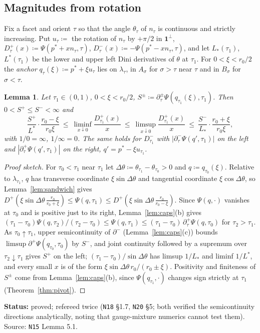 \documentclass[11pt]{article}
\newtheorem{lemma}[theorem]{Lemma}
\theoremstyle{definition}
\theoremstyle{remark}
\newcommand{\one}{\mathbf 1}
\newcommand{\src}[1]{\texttt{#1}}
\newcommand{\status}[1]{\par\smallskip\noindent\textbf{Status:} #1\par\smallskip}
\begin{document}
\subsection{Magnitudes from rotation}

Fix a facet and orient $\tau$ so that the angle $\theta_\tau$ of $n_\tau$ is continuous and strictly increasing. Put $u_\tau\coloneqq$ the rotation of $n_\tau$ by $+\pi/2$ in $\one^\perp$, $D^+_\tau(x)\coloneqq\Psi(p^*+xn_\tau,\tau)$, $D^-_\tau(x)\coloneqq-\Psi(p^*-xn_\tau,\tau)$, and let $L_*(\tau_1)$, $L^*(\tau_1)$ be the lower and upper left Dini derivatives of $\theta$ at $\tau_1$. For $0<\xi<r_0/2$ the \emph{anchor} $q_\tau(\xi)\coloneqq p^*+\xi u_\tau$ lies on $\lambda_\tau$, in $A_\sigma$ for $\sigma>\tau$ near $\tau$ and in $B_\sigma$ for $\sigma<\tau$.

\begin{lemma}\label{lem:rotation}
Let $\tau_1\in(0,1)$, $0<\xi<r_0/2$, $S^\pm\coloneqq\partial^\pm_\tau\Psi(q_{\tau_1}(\xi),\tau_1)$. Then $0<S^+\le S^-<\infty$ and
\[
\frac{S^+}{L^*}\cdot\frac{r_0-\xi}{r_0\xi}\ \le\ \liminf_{x\downarrow0}\frac{D^+_{\tau_1}(x)}x\ \le\ \limsup_{x\downarrow0}\frac{D^+_{\tau_1}(x)}x\ \le\ \frac{S^-}{L_*}\cdot\frac{r_0+\xi}{r_0\xi},
\]
with $1/0=\infty$, $1/\infty=0$. The same holds for $D^-_{\tau_1}$ with $|\partial^-_\tau\Psi(q',\tau_1)|$ on the left and $|\partial^+_\tau\Psi(q',\tau_1)|$ on the right, $q'=p^*-\xi u_{\tau_1}$.
\end{lemma}
\begin{proof}[Proof sketch]
For $\tau_0<\tau_1$ near $\tau_1$ let $\Delta\theta\coloneqq\theta_{\tau_1}-\theta_{\tau_0}>0$ and $q\coloneqq q_{\tau_0}(\xi)$. Relative to $\lambda_{\tau_1}$, $q$ has transverse coordinate $\xi\sin\Delta\theta$ and tangential coordinate $\xi\cos\Delta\theta$, so Lemma~\ref{lem:sandwich} gives $D^+(\xi\sin\Delta\theta\,\tfrac{r_0}{r_0+\xi})\le\Psi(q,\tau_1)\le D^+(\xi\sin\Delta\theta\,\tfrac{r_0}{r_0-\xi})$. Since $\Psi(q,\cdot)$ vanishes at $\tau_0$ and is positive just to its right, Lemma~\ref{lem:caps}(b) gives $(\tau_1-\tau_0)\Psi(q,\tau_2)/(\tau_2-\tau_0)\le\Psi(q,\tau_1)\le(\tau_1-\tau_0)\,\partial^+_\tau\Psi(q,\tau_0)$ for $\tau_2>\tau_1$. As $\tau_0\uparrow\tau_1$, upper semicontinuity of $\partial^-$ (Lemma~\ref{lem:caps}(c)) bounds $\limsup\partial^+\Psi(q_{\tau_0},\tau_0)$ by $S^-$, and joint continuity followed by a supremum over $\tau_2\downarrow\tau_1$ gives $S^+$ on the left; $(\tau_1-\tau_0)/\sin\Delta\theta$ has limsup $1/L_*$ and liminf $1/L^*$, and every small $x$ is of the form $\xi\sin\Delta\theta\,r_0/(r_0\pm\xi)$. Positivity and finiteness of $S^\pm$ come from Lemma~\ref{lem:caps}(b), since $\Psi(q_{\tau_1},\cdot)$ changes sign strictly at $\tau_1$ (Theorem~\ref{thm:pivot}).
\end{proof}
\status{proved; refereed twice (\src{N18} \S1.7, \src{N20} \S5; both verified the semicontinuity directions analytically, noting that gauge-mixture numerics cannot test them). Source: \src{N15} Lemma 5.1.}
\end{document}

